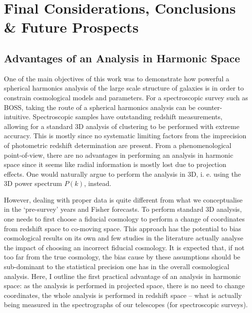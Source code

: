 %
\chapter{Final Considerations, Conclusions \& Future Prospects}
\label{Chap:Conclusions}
\label{Chap:Conclusions}


\section{Advantages of an Analysis in Harmonic Space}
\label{sec:conclusion:Harmonic}
One of the main objectives of this work was to demonstrate how powerful a spherical harmonics analysis of the large scale structure of galaxies is in order to constrain cosmological models and parameters. For a spectroscopic survey such as BOSS, taking the route of a spherical harmonics analysis can be counter-intuitive. Spectroscopic samples have outstanding redshift measurements, allowing for a standard 3D analysis of clustering to be performed with extreme accuracy. This is mostly since no systematic limiting factors from the imprecision of photometric redshift determination are present. From a phenomenological point-of-view, there are no advantages in performing an analysis in harmonic space since it seems like radial information is mostly lost due to projection effects. One would naturally argue to perform the analysis in 3D, i. e. using the 3D power spectrum $P(k)$, instead. 

\qquad However, dealing with proper data is quite different from what we conceptualise in the `pre-survey' years and Fisher forecasts. To perform standard 3D analysis, one needs to first choose a fiducial cosmology to perform a change of coordinates from redshift space to co-moving space. This approach has the potential to bias cosmological results on its own and few studies in the literature actually analyse the impact of choosing an incorrect fiducial cosmology. It is expected that, if not too far from the true cosmology, the bias cause by these assumptions should be sub-dominant to the statistical precision one has in the overall cosmological analysis. Here, I outline the first practical advantage of an analysis in harmonic space: as the analysis is performed in projected space, there is no need to change coordinates, the whole analysis is performed in redshift space -- what is actually being measured in the spectrographs of our telescopes (for spectroscopic surveys).

